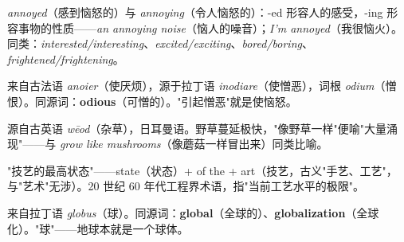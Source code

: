 \documentclass[../main.tex]{subfiles}
\begin{document}
\begin{gram}
\textit{annoyed}（感到恼怒的）与 \textit{annoying}（令人恼怒的）：-ed 形容人的感受，-ing 形容事物的性质——\textit{an annoying noise}（恼人的噪音）；\textit{I'm annoyed}（我很恼火）。同类：\textit{interested/interesting}、\textit{excited/exciting}、\textit{bored/boring}、\textit{frightened/frightening}。
\end{gram}

\begin{origin}
来自古法语 \textit{anoier}（使厌烦），源于拉丁语 \textit{inodiare}（使憎恶），词根 \textit{odium}（憎恨）。同源词：\textbf{odious}（可憎的）。"引起憎恶"就是使恼怒。
\end{origin}




\begin{origin}
源自古英语 \textit{wēod}（杂草），日耳曼语。野草蔓延极快，"像野草一样"便喻"大量涌现"——与 \textit{grow like mushrooms}（像蘑菇一样冒出来）同类比喻。
\end{origin}



\begin{origin}
"技艺的最高状态"——state（状态）+ of the + art（技艺，古义"手艺、工艺"，与"艺术"无涉）。20 世纪 60 年代工程界术语，指"当前工艺水平的极限"。
\end{origin}




\begin{origin}
来自拉丁语 \textit{globus}（球）。同源词：\textbf{global}（全球的）、\textbf{globalization}（全球化）。"球"——地球本就是一个球体。
\end{origin}
\end{document}
